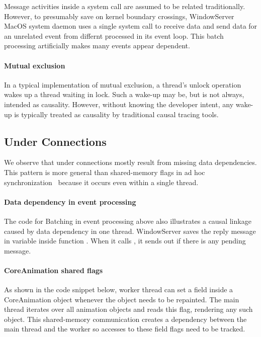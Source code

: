 Message activities inside a system call are assumed to be related traditionally.
However, to presumably save on kernel boundary crossings, WindowServer MacOS
system daemon uses a single system call to receive data and send data for an
unrelated event from differnt processed in its event loop. This batch processing
artificially makes many events appear dependent.

\paragraph{Mutual exclusion}

In a typical implementation of mutual exclusion, a thread's unlock
operation wakes up a thread waiting in lock.  Such a wake-up may be, but
is not always, intended as causality.  However, without knowing the
developer intent, any wake-up is typically treated as causality by
traditional causal tracing tools.

\subsection{Under Connections}

We observe that under connections mostly result from missing data
dependencies.  This pattern is more general than shared-memory flags in ad
hoc synchronization~\cite{xiong2010ad} because it occurs even within a
single thread.

\paragraph{Data dependency in event processing}
The code for Batching in event processing above also illustrates a causal
linkage caused by data dependency in one thread. WindowServer saves the
reply message in variable  inside function
.  When it calls , it
sends out  if there is any pending message.

\paragraph{CoreAnimation shared flags}
As shown in the code snippet below, worker thread can set
a field  inside a CoreAnimation
object whenever the object needs to be repainted. The main thread iterates over
all animation objects and reads this flag, rendering any such object. This
shared-memory communication creates a dependency between the main thread and the
worker so accesses to these field flags need to be tracked.

